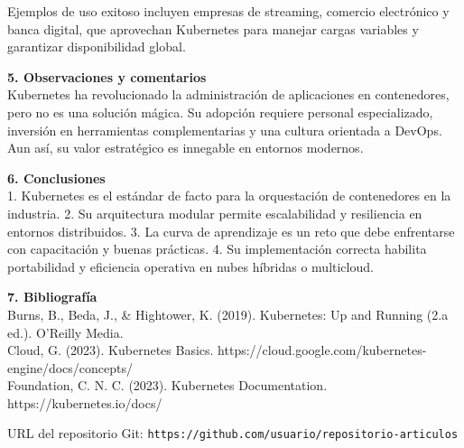 \documentclass[12pt]{article}
\begin{document}
Ejemplos de uso exitoso incluyen empresas de streaming, comercio electrónico y banca digital, que aprovechan Kubernetes para manejar cargas variables y garantizar disponibilidad global.

\textbf{5. Observaciones y comentarios}  
\\
Kubernetes ha revolucionado la administración de aplicaciones en contenedores, pero no es una solución mágica. Su adopción requiere personal especializado, inversión en herramientas complementarias y una cultura orientada a DevOps. Aun así, su valor estratégico es innegable en entornos modernos.

\textbf{6. Conclusiones}  
\\
1. Kubernetes es el estándar de facto para la orquestación de contenedores en la industria.  
2. Su arquitectura modular permite escalabilidad y resiliencia en entornos distribuidos.  
3. La curva de aprendizaje es un reto que debe enfrentarse con capacitación y buenas prácticas.  
4. Su implementación correcta habilita portabilidad y eficiencia operativa en nubes híbridas o multicloud.  

\textbf{7. Bibliografía}  
\\
Burns, B., Beda, J., & Hightower, K. (2019). Kubernetes: Up and Running (2.a ed.). O’Reilly Media.
\\
Cloud, G. (2023). Kubernetes Basics. https://cloud.google.com/kubernetes-engine/docs/concepts/
\\
Foundation, C. N. C. (2023). Kubernetes Documentation. https://kubernetes.io/docs/


\vspace{0.5cm}
\noindent URL del repositorio Git: \texttt{https://github.com/usuario/repositorio-articulos}
\end{document}

